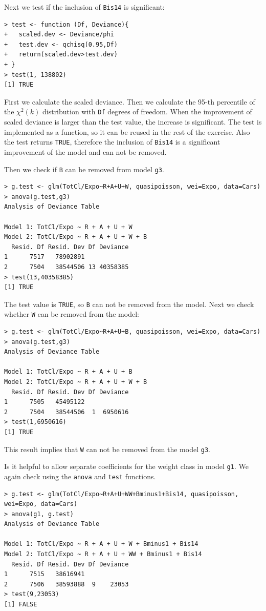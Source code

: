 \documentclass[11pt]{article}
\begin{document}
Next we test if the inclusion of \verb|Bis14| is significant:

\begin{verbatim}
> test <- function (Df, Deviance){
+   scaled.dev <- Deviance/phi
+   test.dev <- qchisq(0.95,Df)
+   return(scaled.dev>test.dev)
+ }
> test(1, 138802)
[1] TRUE
\end{verbatim}

First we calculate the scaled deviance. Then we calculate the 95-th percentile of the $\chi^{2}(k)$ distribution with \verb|Df| degrees of freedom. When the improvement of scaled deviance is larger than the test value, the increase is significant. The test is implemented as a function, so it can be reused in the rest of the exercise. Also the test returns \verb|TRUE|, therefore the inclusion of \verb|Bis14| is a significant improvement of the model and can not be removed.

Then we check if \verb|B| can be removed from model \verb|g3|.

\begin{verbatim}
> g.test <- glm(TotCl/Expo~R+A+U+W, quasipoisson, wei=Expo, data=Cars)
> anova(g.test,g3)
Analysis of Deviance Table

Model 1: TotCl/Expo ~ R + A + U + W
Model 2: TotCl/Expo ~ R + A + U + W + B
  Resid. Df Resid. Dev Df Deviance
1      7517   78902891            
2      7504   38544506 13 40358385
> test(13,40358385)
[1] TRUE
\end{verbatim}

The test value is \verb|TRUE|, so \verb|B| can not be removed from the model. Next we check whether \verb|W| can be removed from the model:

\begin{verbatim}
> g.test <- glm(TotCl/Expo~R+A+U+B, quasipoisson, wei=Expo, data=Cars)
> anova(g.test,g3)
Analysis of Deviance Table

Model 1: TotCl/Expo ~ R + A + U + B
Model 2: TotCl/Expo ~ R + A + U + W + B
  Resid. Df Resid. Dev Df Deviance
1      7505   45495122            
2      7504   38544506  1  6950616
> test(1,6950616)
[1] TRUE
\end{verbatim}

This result implies that \verb|W| can not be removed from the model \verb|g3|.

Is it helpful to allow separate coefficients for the weight class in model \verb|g1|. We again check using the \verb|anova| and \verb|test| functions.

\begin{verbatim}
> g.test <- glm(TotCl/Expo~R+A+U+WW+Bminus1+Bis14, quasipoisson, wei=Expo, data=Cars)
> anova(g1, g.test)
Analysis of Deviance Table

Model 1: TotCl/Expo ~ R + A + U + W + Bminus1 + Bis14
Model 2: TotCl/Expo ~ R + A + U + WW + Bminus1 + Bis14
  Resid. Df Resid. Dev Df Deviance
1      7515   38616941            
2      7506   38593888  9    23053
> test(9,23053)
[1] FALSE
\end{verbatim}
\end{document}
